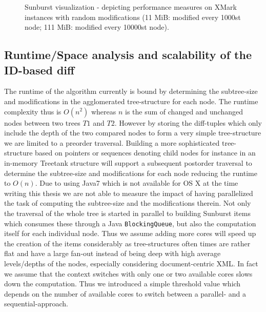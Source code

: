 \begin{figure}[tb]
\caption{\label{fig:gui-performance} Sunburst visualization - depicting performance measures on XMark instances with random modifications (11 MiB: modified every 1000st node; 111 MiB: modified every 10000st node).}
\end{figure}

\subsection{Runtime/Space analysis and scalability of the ID-based diff}
The runtime of the algorithm currently is bound by determining the subtree-size and modifications in the agglomerated tree-structure for each node. The runtime complexity thus is $O(n^2)$ whereas $n$ is the sum of changed and unchanged nodes between two trees $T1$ and $T2$. However by storing the diff-tuples which only include the depth of the two compared nodes to form a very simple tree-structure we are limited to a preorder traversal. Building a more sophisticated tree-structure based on pointers or sequences denoting child nodes for instance in an in-memory Treetank structure will support a subsequent postorder traversal to determine the subtree-size and modifications for each node reducing the runtime to $O(n)$. Due to using Java7 which is not available for OS X at the time writing this thesis we are not able to measure the impact of having parallelized the task of computing the subtree-size and the modifications therein. Not only the traversal of the whole tree is started in parallel to building Sunburst items which consumes these through a Java \texttt{BlockingQueue}, but also the computation itself for each individual node. Thus we assume adding more cores will speed up the creation of the items considerably as tree-structures often times are rather flat and have a large fan-out instead of being deep with high average levels/depths of the nodes, especially considering document-centric XML\cite{ronnau2009efficient}. In fact we assume that the context switches with only one or two available cores slows down the computation. Thus we introduced a simple threshold value which depends on the number of available cores to switch between a parallel- and a sequential-approach. 

